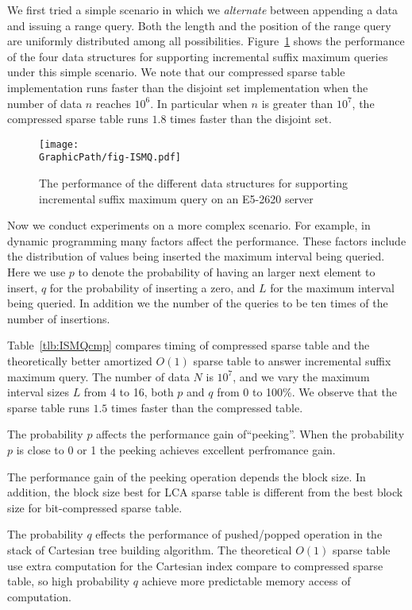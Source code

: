 We first tried a simple scenario in which we {\em alternate} between
appending a data and issuing a range query.  Both the length and the
position of the range query are uniformly distributed among all
possibilities.  Figure~\ref{fig:fig-ISMQcmp} shows the performance of
the four data structures for supporting incremental suffix maximum
queries under this simple scenario.  We note that our compressed
sparse table implementation runs faster than the disjoint set
implementation when the number of data $n$ reaches $10^6$.  In
particular when $n$ is greater than $10^7$, the compressed sparse
table runs $1.8$ times faster than the disjoint set.

\begin{figure}[!thb]
  \centering
  \texttt{[image: \\GraphicPath/fig-ISMQ.pdf]}
  \caption{The performance of the different data structures for
    supporting incremental suffix maximum query on an E5-2620 server}
  \label{fig:fig-ISMQcmp}
\end{figure}

Now we conduct experiments on a more complex scenario.  For example, in
dynamic programming many factors affect the performance. These factors
include the distribution of values being inserted the maximum interval
being queried.  Here we use $p$ to denote the probability of having an
larger next element to insert, $q$ for the probability of inserting a
zero, and $L$ for the maximum interval being queried.  In addition we
the number of the queries to be ten times of the number of insertions.

Table~\ref{tlb:ISMQcmp} compares timing of compressed sparse table and
the theoretically better amortized $O(1)$ sparse table to answer
incremental suffix maximum query.  The number of data $N$ is $10^7$, and
we vary the maximum interval sizes $L$ from 4 to 16, both $p$ and $q$
from 0 to 100\%.  We observe that the sparse table runs $1.5$ times
faster than the compressed table.


The probability $p$ affects the performance gain of``peeking''.  When
the probability $p$ is close to 0 or 1 the peeking achieves excellent
perfromance gain. %

The performance gain of the peeking operation depends the block size.
In addition, the block size best for LCA sparse table is different
from the best block size for bit-compressed sparse table. %

The probability $q$ effects the performance of pushed/popped operation
in the stack of Cartesian tree building algorithm.  The theoretical
$O(1)$ sparse table use extra computation for the Cartesian index
compare to compressed sparse table, so high probability $q$ achieve
more predictable memory access of computation.

